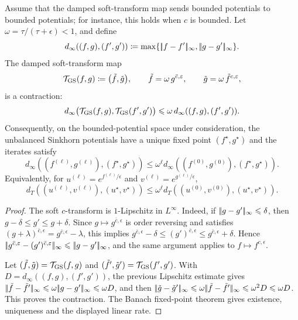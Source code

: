 \begin{prop}\label{prop-unbalanced-sinkhorn-contraction}
	Assume that the damped soft-transform map sends bounded potentials to bounded potentials; for instance, this holds when \(c\) is bounded. Let
	$\omega=\tau/(\tau+\epsilon)<1$, and define
	\[
		d_\infty((f,g),(f',g'))
		\eqdef
		\max\{\norm{f-f'}_\infty,\norm{g-g'}_\infty\}.
	\]
	The damped soft-transform map
	\[
		\mathcal T_{\rm GS}(f,g)
		\eqdef
		\big(\tilde f,\tilde g\big),
		\qquad
		\tilde f=\omega\,g^{\bar c,\epsilon},
		\qquad
		\tilde g=\omega\,\tilde f^{c,\epsilon},
	\]
	is a contraction:
	\[
		d_\infty\big(\mathcal T_{\rm GS}(f,g),\mathcal T_{\rm GS}(f',g')\big)
		\leq
		\omega\, d_\infty((f,g),(f',g')).
	\]
	Consequently, on the bounded-potential space under consideration, the unbalanced Sinkhorn potentials have a unique fixed point
	$(f^\star,g^\star)$ and the iterates satisfy
	\[
		d_\infty((f^{(\ell)},g^{(\ell)}),(f^\star,g^\star))
		\leq
		\omega^\ell d_\infty((f^{(0)},g^{(0)}),(f^\star,g^\star)).
	\]
	Equivalently, for $u^{(\ell)}=e^{f^{(\ell)}/\epsilon}$ and
	$v^{(\ell)}=e^{g^{(\ell)}/\epsilon}$,
	\[
		d_T((u^{(\ell)},v^{(\ell)}),(u^\star,v^\star))
		\leq
		\omega^\ell d_T((u^{(0)},v^{(0)}),(u^\star,v^\star)).
	\]
\end{prop}
\begin{proof}
	The soft $c$-transform is $1$-Lipschitz in $L^\infty$. Indeed, if
	$\norm{g-g'}_\infty\leq \delta$, then $g-\delta\leq g'\leq g+\delta$.
	Since $g\mapsto g^{\bar c,\epsilon}$ is order reversing and satisfies
	$(g+\lambda)^{\bar c,\epsilon}=g^{\bar c,\epsilon}-\lambda$, this implies
	$g^{\bar c,\epsilon}-\delta \leq (g')^{\bar c,\epsilon} \leq g^{\bar c,\epsilon}+\delta$.
	Hence
	$\norm{g^{\bar c,\epsilon}-(g')^{\bar c,\epsilon}}_\infty\leq
	\norm{g-g'}_\infty$, and the same argument applies to
	$f\mapsto f^{c,\epsilon}$.

	Let $(\tilde f,\tilde g)=\mathcal T_{\rm GS}(f,g)$ and
	$(\tilde f',\tilde g')=\mathcal T_{\rm GS}(f',g')$. With
	$D=d_\infty((f,g),(f',g'))$, the previous Lipschitz estimate gives
	$\norm{\tilde f-\tilde f'}_\infty \leq \omega\norm{g-g'}_\infty \leq \omega D$,
	and then
	$\norm{\tilde g-\tilde g'}_\infty \leq \omega\norm{\tilde f-\tilde f'}_\infty \leq \omega^2D \leq \omega D$.
	This proves the contraction. The Banach fixed-point theorem gives
	existence, uniqueness and the displayed linear rate.
\end{proof}

